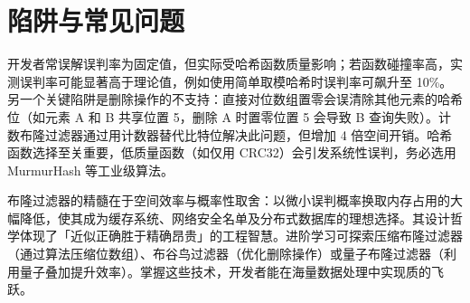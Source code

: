 \chapter{陷阱与常见问题}
开发者常误解误判率为固定值，但实际受哈希函数质量影响；若函数碰撞率高，实测误判率可能显著高于理论值，例如使用简单取模哈希时误判率可飙升至 10\%{}。另一个关键陷阱是删除操作的不支持：直接对位数组置零会误清除其他元素的哈希位（如元素 A 和 B 共享位置 5，删除 A 时置零位置 5 会导致 B 查询失败）。计数布隆过滤器通过用计数器替代比特位解决此问题，但增加 4 倍空间开销。哈希函数选择至关重要，低质量函数（如仅用 CRC32）会引发系统性误判，务必选用 MurmurHash 等工业级算法。\par
布隆过滤器的精髓在于空间效率与概率性取舍：以微小误判概率换取内存占用的大幅降低，使其成为缓存系统、网络安全名单及分布式数据库的理想选择。其设计哲学体现了「近似正确胜于精确昂贵」的工程智慧。进阶学习可探索压缩布隆过滤器（通过算法压缩位数组）、布谷鸟过滤器（优化删除操作）或量子布隆过滤器（利用量子叠加提升效率）。掌握这些技术，开发者能在海量数据处理中实现质的飞跃。\par
